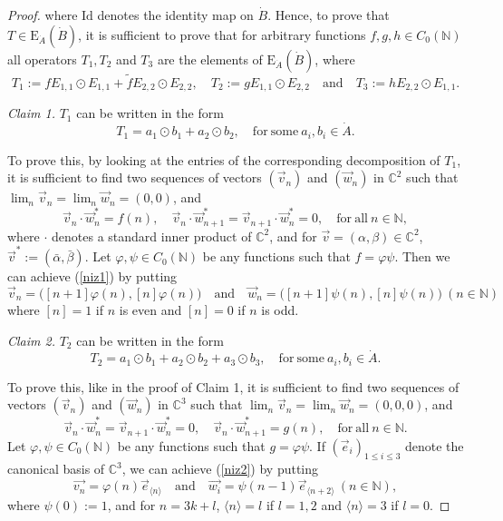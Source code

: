 \documentclass[]{amsart}
\theoremstyle{remark}
\theoremstyle{definition}
\theoremstyle{question}
\numberwithin{equation}{section}
\begin{document}
\begin{proof}
where $\mathrm{Id}$ denotes the identity map on $\dot{B}$.
Hence, to prove that $T \in {\mathrm{E}}_{\dot{A}}(\dot{B})$, it is sufficient to prove that for
arbitrary functions $f,g,h \in C_0({\mathbb{N}})$ all operators $T_1,T_2$ and $T_3$ are
the elements of ${\mathrm{E}}_{\dot{A}}(\dot{B})$, where
$$T_1:=f E_{1,1} \odot E_{1,1} + \tilde{f}E_{2,2} \odot E_{2,2}, \quad T_2:=g
E_{1,1} \odot E_{2,2} \quad \mathrm{and} \quad  T_3:=h E_{2,2} \odot E_{1,1}.$$

\textit{Claim 1.} $T_1$ can be written in the form $$T_1 = a_1 \odot b_1 + a_2 \odot
b_2, \quad \mathrm{for} \ \mathrm{some}\  a_i,b_i \in \dot{A}.$$

To prove this, by looking at the entries of the corresponding decomposition of $T_1$, it is sufficient to find two sequences of vectors $(\vec{v}_n)$ and $(\vec{w}_n)$ in ${\mathbb{C}}^2$ such that
$\lim_n \vec{v}_n = \lim_n \vec{w}_n = (0,0)$, and
\begin{equation}\label{niz1}
\vec{v}_n \cdot \vec{w}^*_n = f(n), \quad \vec{v}_{n} \cdot
\vec{w}^*_{n+1}=\vec{v}_{n+1} \cdot \vec{w}^*_n=0, \quad \mathrm{for} \ \mathrm{all} \ n \in {\mathbb{N}},
\end{equation}
where $\cdot$ denotes a standard inner product of ${\mathbb{C}}^2$, and for
$\vec{v}=(\alpha, \beta) \in {\mathbb{C}}^2$, $\vec{v}^*:=(\bar{\alpha}, \bar{\beta})$.
Let $\varphi,\psi \in C_0({\mathbb{N}})$ be any functions such that $f=\varphi \psi$. Then
we can achieve (\ref{niz1})
by putting $$\vec{v}_n=\Big([n+1] \varphi(n),
[n] \varphi(n)\Big ) \quad \mathrm{and} \quad  \vec{w}_n=\Big ([n+1]
\psi(n), [n]\psi(n) \Big) \ (n \in {\mathbb{N}})$$
where $[n]=1$ if $n$ is even and $[n]=0$ if $n$ is odd.

\textit{Claim 2.} $T_2$ can be written in the form $$T_2 = a_1 \odot b_1 + a_2 \odot
b_2+ a_3 \odot b_3, \quad \mathrm{for} \ \mathrm{some}\  a_i,b_i \in
\dot{A}.$$

To prove this, like in the proof of Claim 1, it is sufficient to find two sequences of vectors
$(\vec{v}_n)$ and $(\vec{w}_n)$ in ${\mathbb{C}}^3$ such that
$\lim_n \vec{v}_n = \lim_n \vec{w}_n = (0,0,0)$, and
\begin{equation}\label{niz2}
\vec{v}_n \cdot \vec{w}^*_n = \vec{v}_{n+1} \cdot \vec{w}^*_n= 0, \quad
\vec{v}_{n} \cdot \vec{w}^*_{n+1}=g(n), \quad \mathrm{for} \ \mathrm{all} \ n \in {\mathbb{N}}.
\end{equation}
Let $\varphi,\psi \in C_0({\mathbb{N}})$ be any functions such that $g=\varphi \psi$. If $(\vec{e}_i)_{1\leq i \leq 3}$ denote the canonical basis of ${\mathbb{C}}^3$,
we can achieve (\ref{niz2}) by putting
$$\vec{v_n}= \varphi(n) \vec{e}_{\langle n \rangle}  \quad \mathrm{ and} \quad   \vec{w_i}= \psi(n-1) \vec{e}_{\langle n+2 \rangle} \ (n \in {\mathbb{N}}),$$
where $\psi(0):=1$, and for $n=3k+l$, $\langle n \rangle =l$ if $l=1,2$ and $\langle n \rangle=3$ if $l=0$.


\end{proof}
\end{document}
